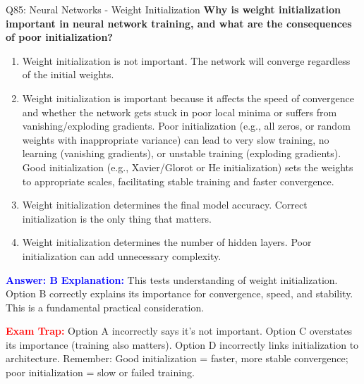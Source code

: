 \documentclass[8pt]{beamer}
\begin{document}
	\begin{frame}{Q85: Neural Networks - Weight Initialization}
		\fontsize{6.5}{7.5}\selectfont
		\textbf{Why is weight initialization important in neural network training, and what are the consequences of poor initialization?}
		
		\begin{enumerate}
			\item Weight initialization is not important. The network will converge regardless of the initial weights.
			\item Weight initialization is important because it affects the speed of convergence and whether the network gets stuck in poor local minima or suffers from vanishing/exploding gradients. Poor initialization (e.g., all zeros, or random weights with inappropriate variance) can lead to very slow training, no learning (vanishing gradients), or unstable training (exploding gradients). Good initialization (e.g., Xavier/Glorot or He initialization) sets the weights to appropriate scales, facilitating stable training and faster convergence.
			\item Weight initialization determines the final model accuracy. Correct initialization is the only thing that matters.
			\item Weight initialization determines the number of hidden layers. Poor initialization can add unnecessary complexity.
		\end{enumerate}
		
		\vspace{0.1cm}
		\textcolor{blue}{\textbf{Answer: B}}
		\vspace{0.1cm}
		\textcolor{blue}{\textbf{Explanation:}} This tests understanding of weight initialization. Option B correctly explains its importance for convergence, speed, and stability. This is a fundamental practical consideration.
		
		\textcolor{red}{\textbf{Exam Trap:}} Option A incorrectly says it's not important. Option C overstates its importance (training also matters). Option D incorrectly links initialization to architecture. Remember: Good initialization = faster, more stable convergence; poor initialization = slow or failed training.
	\end{frame}
	
\end{document}
